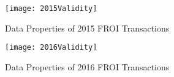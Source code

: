 \documentclass[9pt, oneside]{article}   	%
\begin{document}
\begin{figure}[htp]
\caption{Data Properties of 2015 FROI Transactions}

\label{2015 Quality}
\begin{center}
\texttt{[image: 2015Validity]}
\end{center}
\end{figure}

\begin{figure}[htp]
\caption{Data Properties of 2016 FROI Transactions}

\label{2016 Quality}
\begin{center}
\texttt{[image: 2016Validity]}
\end{center}
\end{figure}
\end{document}
